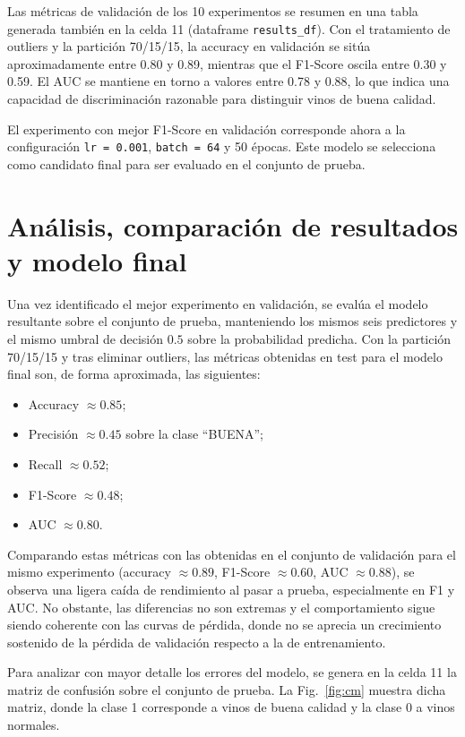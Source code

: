 \documentclass[conference]{IEEEtran}
\begin{document}
Las métricas de validación de los 10 experimentos se resumen en una tabla
generada también en la celda 11 (dataframe \texttt{results\_df}). Con el
tratamiento de outliers y la partición 70/15/15, la accuracy en validación se
sitúa aproximadamente entre 0.80 y 0.89, mientras que el F1-Score oscila entre
0.30 y 0.59. El AUC se mantiene en torno a valores entre 0.78 y 0.88, lo que
indica una capacidad de discriminación razonable para distinguir vinos de
buena calidad.

El experimento con mejor F1-Score en validación corresponde ahora a la
configuración \texttt{lr = 0.001}, \texttt{batch = 64} y 50 épocas. Este
modelo se selecciona como candidato final para ser evaluado en el conjunto de
prueba.

\section{Análisis, comparación de resultados y modelo final}

Una vez identificado el mejor experimento en validación, se evalúa el modelo
resultante sobre el conjunto de prueba, manteniendo los mismos seis
predictores y el mismo umbral de decisión $0.5$ sobre la probabilidad
predicha. Con la partición 70/15/15 y tras eliminar outliers, las
métricas obtenidas en test para el modelo final son, de forma aproximada, las
siguientes:
\begin{itemize}
    \item Accuracy $\approx 0.85$;
    \item Precisión $\approx 0.45$ sobre la clase ``BUENA'';
    \item Recall $\approx 0.52$;
    \item F1-Score $\approx 0.48$;
    \item AUC $\approx 0.80$.
\end{itemize}

Comparando estas métricas con las obtenidas en el conjunto de validación para
el mismo experimento (accuracy $\approx 0.89$, F1-Score $\approx 0.60$, AUC
$\approx 0.88$), se observa una ligera caída de rendimiento al pasar a prueba,
especialmente en F1 y AUC. No obstante, las diferencias no son extremas y el
comportamiento sigue siendo coherente con las curvas de pérdida, donde no se
aprecia un crecimiento sostenido de la pérdida de validación respecto a la de
entrenamiento.

Para analizar con mayor detalle los errores del modelo, se genera en la celda
11 la matriz de confusión sobre el conjunto de prueba. La Fig.~\ref{fig:cm}
muestra dicha matriz, donde la clase 1 corresponde a vinos de buena calidad y
la clase 0 a vinos normales.
\end{document}
